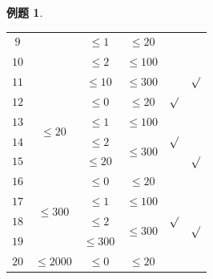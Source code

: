 \documentclass{article}
\newtheorem{example}{例题}[subsection]
\theoremstyle{nonumberplain}
\begin{document}
\begin{example}
\begin{center}
\begin{tabular}{c|c|c|c|c|c}
				\cline{1-1}\cline{3-4}\cline{6-6}
				$9$    &                              & $\leq 1$                     & $\leq 20$                   &                          & \multirow{2}{*}{\times}  \\
				\cline{1-1}\cline{3-5}
				$10$   &                              & $\leq 2$                     & $\leq 100$                  & \multirow{2}{*}{\times}  &                          \\
				\cline{1-1}\cline{3-4}\cline{6-6}
				$11$   &                              & $\leq 10$                    & $\leq 300$                  &                          & $\surd$                  \\
				\hline
				$12$   & \multirow{4}{*}{$\leq 20$}   & $\leq 0$                     & $\leq 20$                   & $\surd$                  & \multirow{3}{*}{\times}  \\
				\cline{1-1}\cline{3-5}
				$13$   &                              & $\leq 1$                     & $\leq 100$                  & \times                   &                          \\
				\cline{1-1}\cline{3-5}
				$14$   &                              & $\leq 2$                     & \multirow{2}{*}{$\leq 300$} & $\surd$                                             \\
				\cline{1-1}\cline{3-3}\cline{5-6}
				$15$   &                              & $\leq 20$                    &                             & \multirow{3}{*}{\times}  & $\surd$                  \\
				\cline{1-4}\cline{6-6}
				$16$   & \multirow{4}{*}{$\leq 300$}  & $\leq 0$                     & $\leq 20$                   &                          & \multirow{2}{*}{\times}  \\
				\cline{1-1}\cline{3-4}
				$17$   &                              & $\leq 1$                     & $\leq 100$                  &                                                     \\
				\cline{1-1}\cline{3-6}
				$18$   &                              & $\leq 2$                     & \multirow{2}{*}{$\leq 300$} & $\surd$                  & \multirow{2}{*}{$\surd$} \\
				\cline{1-1}\cline{3-3}\cline{5-5}
				$19$   &                              & $\leq 300$                   &                             & \multirow{7}{*}{\times}  &                          \\
				\cline{1-4}\cline{6-6}
				$20$   & \multirow{6}{*}{$\leq 2000$} & $\leq 0$                     & \multirow{2}{*}{$\leq 20$}  &                          & \multirow{6}{*}{\times}  \\

\end{tabular}
\end{center}
\end{example}
\end{document}
